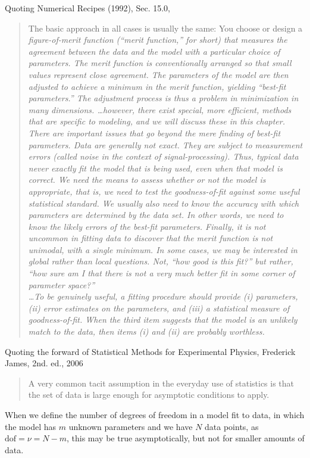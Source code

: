 \documentclass[12pt]{article}
\begin{document}
\noindent Quoting  Numerical Recipes (1992), Sec. 15.0, 
\begin{quote}
The basic approach in all cases is usually the same: You choose or design a \it figure-of-merit function \rm
   (``merit function,'' for short) that measures the agreement between the data and
      the model with a particular choice of parameters.
The merit function is conventionally arranged so that small values represent close agreement.
The parameters of the model are then adjusted to achieve a minimum in the merit function,
   yielding ``best-fit parameters.''
The adjustment process is thus a problem in minimization in many dimensions.
  \ldots however, there exist special, more efficient, methods that are specific to
  modeling, and we will discuss these in this chapter.\\
  
\noindent There are important issues that go beyond the mere finding of best-fit
   parameters.
Data are generally not exact.
They are subject to measurement errors (called noise in the context of signal-processing).
Thus, typical data never exactly fit the model that is being used, even when that
    model is correct.
We need the means to assess whether or not the model is appropriate, that is,
    we need to test the goodness-of-fit against some useful statistical standard.
We usually also need to know the accuracy with which parameters are determined
   by the data set.
In other words, we need to know the likely errors of the best-fit parameters.
Finally, it is not uncommon in fitting data to discover that the merit function is
   not unimodal, with a single minimum.
In some cases, we may be interested in global rather than local questions.
Not, ``how good is this fit?'' but rather, ``how sure am I that there is not a very
     much better fit in some corner of parameter space?''\\
	
\noindent  \ldots To be genuinely useful, a fitting procedure should provide (i) parameters,
   (ii) error estimates on the parameters, and (iii) a statistical measure of goodness-of-fit.
When the third item suggests that the model is an unlikely match to the data, then
   items (i) and (ii) are probably worthless.   
\end{quote}
Quoting the forward of Statistical Methods for Experimental Physics, Frederick James, 2nd. ed., 2006
\begin{quote}
A very common tacit assumption in the everyday use of statistics is that the set of
  data is large enough for asymptotic conditions to apply.
\end{quote}
When we define the number of degrees of freedom in a model fit to data, in which
  the model has $m$ unknown parameters and we have $N$ data points, as
  $\text{dof} = \nu = N - m$, this may be true asymptotically, but not for smaller
   amounts of data.\\
   
\end{document}
